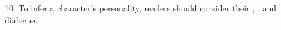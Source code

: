 \documentclass[12pt]{article}
\begin{document}
10. To infer a character’s personality, readers should consider their \underline{\hspace{4cm}}, \underline{\hspace{4cm}}, and dialogue.  
\vspace{2cm}




\end{document}
